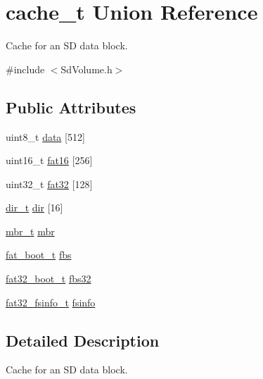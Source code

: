 \hypertarget{unioncache__t}{}\section{cache\+\_\+t Union Reference}
\label{unioncache__t}


Cache for an SD data block.  




{\ttfamily \#include $<$Sd\+Volume.\+h$>$}

\subsection*{Public Attributes}
\begin{DoxyCompactItemize}
\item 
uint8\+\_\+t \hyperlink{unioncache__t_ae675b7a3a87d809070de111d1d1f1d81}{data} \mbox{[}512\mbox{]}
\item 
uint16\+\_\+t \hyperlink{unioncache__t_a8f3a4e9392a7d8ace954fc44c57df887}{fat16} \mbox{[}256\mbox{]}
\item 
uint32\+\_\+t \hyperlink{unioncache__t_a57e16421bf460d1ba6cb9ce9a23a4a83}{fat32} \mbox{[}128\mbox{]}
\item 
\hyperlink{_sd_fat_structs_8h_a803db59d4e16a0c54a647afc6a7954e3}{dir\+\_\+t} \hyperlink{unioncache__t_a7396fdbdb7c52bd1d72c5329ff32acd1}{dir} \mbox{[}16\mbox{]}
\item 
\hyperlink{_sd_fat_structs_8h_a7c429e5097f101c8c97663d6c4155bd9}{mbr\+\_\+t} \hyperlink{unioncache__t_a6ac10bfb1ebb1139c448456679663bb6}{mbr}
\item 
\hyperlink{_sd_fat_structs_8h_aedac4595ee08198da26c14b9891a07d5}{fat\+\_\+boot\+\_\+t} \hyperlink{unioncache__t_ad1a4f1c0e8b8ca4d530427dbc920c764}{fbs}
\item 
\hyperlink{_sd_fat_structs_8h_a38fa081d004647a828095d31b07ec491}{fat32\+\_\+boot\+\_\+t} \hyperlink{unioncache__t_ad0613173ed4e83920eedfeb33102848a}{fbs32}
\item 
\hyperlink{_sd_fat_structs_8h_a6030ed0fce3a819326a2548407fc8556}{fat32\+\_\+fsinfo\+\_\+t} \hyperlink{unioncache__t_a46c7b14586a6248824a97101111cbae1}{fsinfo}
\end{DoxyCompactItemize}


\subsection{Detailed Description}
Cache for an SD data block. 

